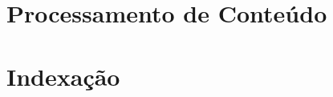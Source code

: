 \documentclass[
	12pt,				%
	openright,			%
	oneside,			%
	a4paper,			%
	english,			%
	french,				%
	spanish,			%
	brazil				%
	]{abntex2}
\begin{document}
\section{Processamento de Conteúdo}\label{sec:processamento-de-conteudo}

\section{Indexação}\label{sec:indexacao}
%

\end{document}

